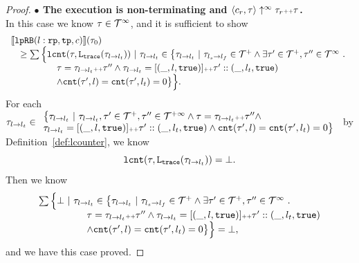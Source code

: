 \begin{proof}
\textbf{$\bullet$ The execution is non-terminating and {$\langle {c_r}, \mathtt{\tau} \rangle \uparrow^{\infty} \mathtt{\tau}_r {\scriptscriptstyle ++} \mathtt{\tau}$}.} 
\\
 In this case we know $\mathtt{\tau} \in \mathcal{T}^{\infty}$, and it is sufficient to show
\\
\[
  \begin{array}{l}
    \llbracket \mathtt{lpRB}(l: \mathtt{rp}, \mathtt{tp}, c) \rrbracket(\mathtt{\tau}_0) 
    \\ \quad \geq 
      \sum\Big\{
      \mathtt{lcnt}(\mathtt{\tau}, \mathtt{L}_{\mathtt{{trace}}}(\mathtt{\tau}_{l \to l_t})) 
      ~\vert~ \mathtt{\tau}_{l \to l_t} \in 
      \big\{\mathtt{\tau}_{l \to l_t} 
      ~\vert~ \mathtt{\tau}_{l_s \to l_f}\in \mathcal{T}^{+} 
      \land \exists  \mathtt{\tau}' \in \mathcal{T}^{+}, \mathtt{\tau}''\in \mathcal{T}^{\infty}
      ~.~ 
      \\ \quad\qquad \qquad
      \mathtt{\tau} = \mathtt{\tau}_{l \to l_t} {\scriptscriptstyle ++} \mathtt{\tau}''
      \land \mathtt{\tau}_{l \to l_t} = [(\_, l, \mathtt{true})] {\scriptscriptstyle ++} \mathtt{\tau}' :: (\_, l_t, \mathtt{true})
      \\ \quad\qquad \qquad
      \land \mathtt{cnt}(\mathtt{\tau}', l) = \mathtt{cnt}(\mathtt{\tau}', l_t) = 0 
      \big\}
    \Big\}.
  \end{array}
\]
For each 
$\mathtt{\tau}_{l \to l_t} \in
\begin{array}{l}
    \big\{\mathtt{\tau}_{l \to l_t} ~\vert~ 
    \mathtt{\tau}_{l \to l_t}, \mathtt{\tau}' \in \mathcal{T}^{+}, \mathtt{\tau}'' \in \mathcal{T}^{+\infty}
    \land \mathtt{\tau} = \mathtt{\tau}_{l \to l_t} {\scriptscriptstyle ++} \mathtt{\tau}''
    \land 
    \\
   \mathtt{\tau}_{l \to l_t} = [(\_, l, \mathtt{true})] {\scriptscriptstyle ++} \mathtt{\tau}' :: (\_, l_t, \mathtt{true})
    \land \mathtt{cnt}(\mathtt{\tau}', l) = \mathtt{cnt}(\mathtt{\tau}', l_t) = 0 
    \big\}
\end{array}
$ by Definition~\ref{def:lcounter}, we know 
\[
  \mathtt{lcnt}(\mathtt{\tau}, \mathtt{L}_{\mathtt{{trace}}}(\mathtt{\tau}_{l \to l_t})) = \bot.
\]
Then we know
\[
  \begin{array}{l}
      \sum\Big\{ \bot ~\vert~ \mathtt{\tau}_{l \to l_t} \in 
      \big\{\mathtt{\tau}_{l \to l_t} 
      ~\vert~ \mathtt{\tau}_{l_s \to l_f}\in \mathcal{T}^{+} 
      \land \exists  \mathtt{\tau}' \in \mathcal{T}^{+}, \mathtt{\tau}''\in \mathcal{T}^{\infty}
      ~.~ 
      \\ \quad\qquad \qquad
      \mathtt{\tau} = \mathtt{\tau}_{l \to l_t} {\scriptscriptstyle ++} \mathtt{\tau}''
      \land \mathtt{\tau}_{l \to l_t} = [(\_, l, \mathtt{true})] {\scriptscriptstyle ++} \mathtt{\tau}' :: (\_, l_t, \mathtt{true})
      \\ \quad\qquad \qquad
      \land \mathtt{cnt}(\mathtt{\tau}', l) = \mathtt{cnt}(\mathtt{\tau}', l_t) = 0 
      \big\}
      \Big\} = \bot,
  \end{array}
  \]
and we have this case proved.
\end{proof}